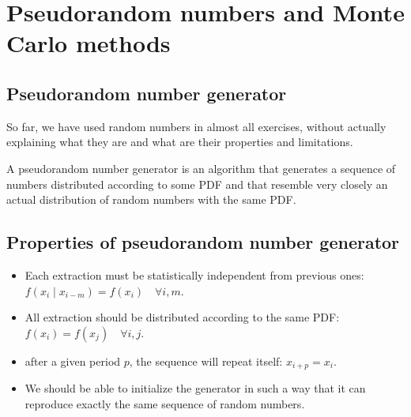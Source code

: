 

\section{Pseudorandom numbers and Monte Carlo methods}
\label{sec:pseudorandom_number}

\subsection{Pseudorandom number generator}
\label{subsec:pseudorandom_number_generator}

So far, we have used random numbers in almost all exercises, without actually explaining what they are and what are their properties and limitations. 

A pseudorandom number generator is an algorithm that generates a sequence of numbers distributed according to some PDF and that resemble very closely an actual distribution of random numbers with the same PDF.

\subsection{Properties of pseudorandom number generator}
\label{subsec:prop_of_pseudorandom_number_generator}

\begin{itemize}[$\to$]
	\item Each extraction must be statistically independent from previous ones: $f(x_{i} \mid x_{i - m}) = f(x_{i}) \quad \forall i, m$.
	\item All extraction should be distributed according to the same PDF: $f(x_{i}) = f(x_{j}) \quad \forall i, j$.
	\item after a given period $p$, the sequence will repeat itself: $x_{i + p} = x_{i}$.
	\item We should be able to initialize the generator in such a way that it can reproduce exactly the same sequence of random numbers.
\end{itemize}


